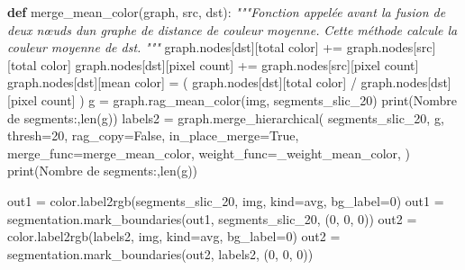 \documentclass[
]{article}
\newenvironment{Shaded}{}{}
\newcommand{\BuiltInTok}[1]{\textcolor[rgb]{0.00,0.50,0.00}{#1}}
\newcommand{\CommentTok}[1]{\textcolor[rgb]{0.38,0.63,0.69}{\textit{#1}}}
\newcommand{\DecValTok}[1]{\textcolor[rgb]{0.25,0.63,0.44}{#1}}
\newcommand{\KeywordTok}[1]{\textcolor[rgb]{0.00,0.44,0.13}{\textbf{#1}}}
\newcommand{\NormalTok}[1]{#1}
\newcommand{\OperatorTok}[1]{\textcolor[rgb]{0.40,0.40,0.40}{#1}}
\newcommand{\StringTok}[1]{\textcolor[rgb]{0.25,0.44,0.63}{#1}}
\newcommand{\VariableTok}[1]{\textcolor[rgb]{0.10,0.09,0.49}{#1}}
\begin{document}
\begin{Shaded}
\begin{Highlighting}[]
\KeywordTok{def}\NormalTok{ merge\_mean\_color(graph, src, dst):}
    \CommentTok{"""Fonction appelée avant la fusion de deux nœuds d\textquotesingle{}un graphe de distance de couleur moyenne.}
\CommentTok{      Cette méthode calcule la couleur moyenne de \textasciigrave{}dst\textasciigrave{}.}
\CommentTok{    """}
\NormalTok{    graph.nodes[dst][}\StringTok{\textquotesingle{}total color\textquotesingle{}}\NormalTok{] }\OperatorTok{+=}\NormalTok{ graph.nodes[src][}\StringTok{\textquotesingle{}total color\textquotesingle{}}\NormalTok{]}
\NormalTok{    graph.nodes[dst][}\StringTok{\textquotesingle{}pixel count\textquotesingle{}}\NormalTok{] }\OperatorTok{+=}\NormalTok{ graph.nodes[src][}\StringTok{\textquotesingle{}pixel count\textquotesingle{}}\NormalTok{]}
\NormalTok{    graph.nodes[dst][}\StringTok{\textquotesingle{}mean color\textquotesingle{}}\NormalTok{] }\OperatorTok{=}\NormalTok{ (}
\NormalTok{        graph.nodes[dst][}\StringTok{\textquotesingle{}total color\textquotesingle{}}\NormalTok{] }\OperatorTok{/}\NormalTok{ graph.nodes[dst][}\StringTok{\textquotesingle{}pixel count\textquotesingle{}}\NormalTok{]}
\NormalTok{    )}
\NormalTok{g }\OperatorTok{=}\NormalTok{ graph.rag\_mean\_color(img, segments\_slic\_20)}
\BuiltInTok{print}\NormalTok{(}\StringTok{\textquotesingle{}Nombre de segments:\textquotesingle{}}\NormalTok{,}\BuiltInTok{len}\NormalTok{(g))}
\NormalTok{labels2 }\OperatorTok{=}\NormalTok{ graph.merge\_hierarchical(}
\NormalTok{    segments\_slic\_20,}
\NormalTok{    g,}
\NormalTok{    thresh}\OperatorTok{=}\DecValTok{20}\NormalTok{,}
\NormalTok{    rag\_copy}\OperatorTok{=}\VariableTok{False}\NormalTok{,}
\NormalTok{    in\_place\_merge}\OperatorTok{=}\VariableTok{True}\NormalTok{,}
\NormalTok{    merge\_func}\OperatorTok{=}\NormalTok{merge\_mean\_color,}
\NormalTok{    weight\_func}\OperatorTok{=}\NormalTok{\_weight\_mean\_color,}
\NormalTok{)}
\BuiltInTok{print}\NormalTok{(}\StringTok{\textquotesingle{}Nombre de segments:\textquotesingle{}}\NormalTok{,}\BuiltInTok{len}\NormalTok{(g))}

\NormalTok{out1 }\OperatorTok{=}\NormalTok{ color.label2rgb(segments\_slic\_20, img, kind}\OperatorTok{=}\StringTok{\textquotesingle{}avg\textquotesingle{}}\NormalTok{, bg\_label}\OperatorTok{=}\DecValTok{0}\NormalTok{)}
\NormalTok{out1 }\OperatorTok{=}\NormalTok{ segmentation.mark\_boundaries(out1, segments\_slic\_20, (}\DecValTok{0}\NormalTok{, }\DecValTok{0}\NormalTok{, }\DecValTok{0}\NormalTok{))}
\NormalTok{out2 }\OperatorTok{=}\NormalTok{ color.label2rgb(labels2, img, kind}\OperatorTok{=}\StringTok{\textquotesingle{}avg\textquotesingle{}}\NormalTok{, bg\_label}\OperatorTok{=}\DecValTok{0}\NormalTok{)}
\NormalTok{out2 }\OperatorTok{=}\NormalTok{ segmentation.mark\_boundaries(out2, labels2, (}\DecValTok{0}\NormalTok{, }\DecValTok{0}\NormalTok{, }\DecValTok{0}\NormalTok{))}


\end{Highlighting}
\end{Shaded}
\end{document}
